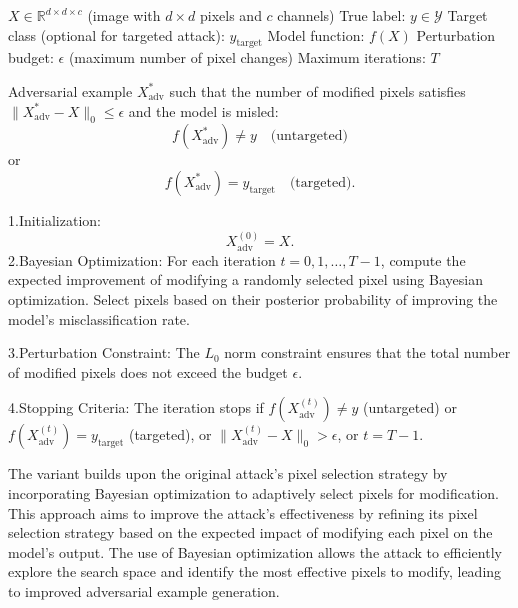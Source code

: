 $X \in \mathbb{R}^{d \times d \times c}$ (image with $d \times d$ pixels and $c$ channels)
True label: $y \in \mathcal{Y}$
Target class (optional for targeted attack): $y_{\text{target}}$
Model function: $f(X)$
Perturbation budget: $\epsilon$ (maximum number of pixel changes)
Maximum iterations: $T$

Adversarial example $X_{\text{adv}}^*$ such that the number of modified pixels satisfies $\|X_{\text{adv}}^* - X\|_0 \leq \epsilon$ and the model is misled:
\[
f(X_{\text{adv}}^*) \neq y \quad \text{(untargeted)}
\]
or
\[
f(X_{\text{adv}}^*) = y_{\text{target}} \quad \text{(targeted)}.
\]


1.Initialization:
   \[
   X_{\text{adv}}^{(0)} = X.
   \]
2.Bayesian Optimization:
For each iteration $t = 0, 1, \dots, T-1$, compute the expected improvement of modifying a randomly selected pixel using Bayesian optimization. Select pixels based on their posterior probability of improving the model's misclassification rate.

3.Perturbation Constraint: The $L_0$ norm constraint ensures that the total number of modified pixels does not exceed the budget $\epsilon$.

4.Stopping Criteria: The iteration stops if  $f(X_{\text{adv}}^{(t)}) \neq y$ (untargeted) or $f(X_{\text{adv}}^{(t)}) = y_{\text{target}}$ (targeted), or $\|X_{\text{adv}}^{(t)} - X\|_0 > \epsilon$, or $t = T-1$.

The variant builds upon the original attack's pixel selection strategy by incorporating Bayesian optimization to adaptively select pixels for modification. This approach aims to improve the attack's effectiveness by refining its pixel selection strategy based on the expected impact of modifying each pixel on the model's output. The use of Bayesian optimization allows the attack to efficiently explore the search space and identify the most effective pixels to modify, leading to improved adversarial example generation.